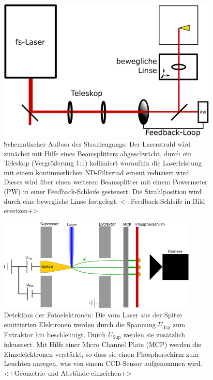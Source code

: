 \documentclass[bachelor,       %
               twoside,        %
               BCOR10mm,       %
               english,ngerman, %
               ]{GAUBM}
\begin{document}
\begin{figure}[h!]
	\centering
	\includegraphics[width=0.8\linewidth]{Aufbau2}
	\caption{Schematischer Aufbau des Strahlengangs: Der Laserstrahl wird zunächst mit Hilfe eines Beamsplitters abgeschwächt, durch ein Teleskop (Vergrößerung 1:1)  kollimiert woraufhin die Laserleistung mit einem kontinuierlichen ND-Filterrad erneut reduziert wird. Dieses wird über einen weiteren Beamsplitter mit einem Powermeter (PW) in einer Feedback-Schleife gesteuert. Die Strahlposition wird durch eine bewegliche Linse festgelegt. <+Feedback-Schleife in Bild ersetzen+>}
	\label{fig:aufbau}
\end{figure}


\begin{figure}[h!]
	\centering
	\includegraphics[width=0.9\textwidth]{Kammer_Aufbau}
	\caption{Detektion der Fotoelektronen: Die vom Laser aus der Spitze emittierten Elektronen werden durch die Spannung $U_\text{Tip}$ zum Extraktor hin beschleunigt. Durch $U_\text{Sup}$ werden sie zusätzlich fokussiert. Mit Hilfe einer Micro Channel Plate (MCP) werden die Einzelelektronen verstärkt, so dass sie einen Phosphorschirm zum Leuchten anregen, was von einem CCD-Sensor aufgenommen wird. <+Geometrie und Abst\"ande einzeichen+>}
	\label{fig:aufbau_kammer}
\end{figure}
\end{document}
